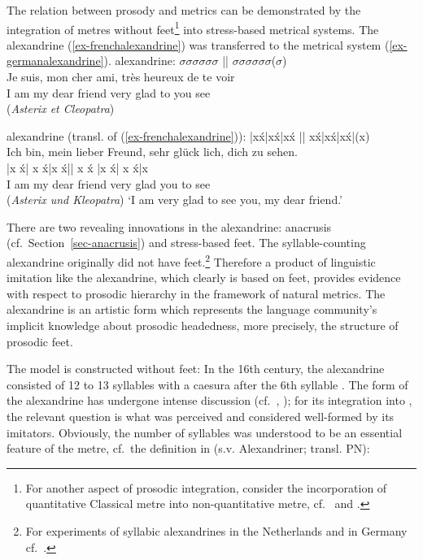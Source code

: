 \documentclass[output=paper
  ,nobabel
  ,uniformtopskip %
]{langscibook}
\begin{document}
The relation between prosody and metrics can be demonstrated by the integration of metres without feet\footnote{For another aspect of prosodic integration, consider the incorporation of quantitative Classical metre into non-quantitative  metre, cf.\ \eg \citet{Wackernagel1831} and \citet{NoelAzizHanna2008b}.} into stress-based metrical systems. The  alexandrine (\ref{ex-frenchalexandrine}) was transferred to the  metrical system (\ref{ex-germanalexandrine}).
\eal
\ex\label{ex-frenchalexandrine}
  alexandrine:  ${\sigma}{\sigma}{\sigma}{\sigma}{\sigma}{\sigma}$ ||  ${\sigma}{\sigma}{\sigma}{\sigma}{\sigma}{\sigma}$(${\sigma}$)\\
\gll Je  suis,  mon  cher  ami,    très  heureux    de  te  voir\\
     I  am  my  dear  friend    very  glad    to  you  see\\
\glt (\textit{Asterix et Cleopatra})

\ex\label{ex-germanalexandrine}
  alexandrine (transl. of (\ref{ex-frenchalexandrine})): |x\'{x}|x\'{x}|x\'{x} || x\'{x}|x\'{x}|x\'{x}|(x)\\
\glll Ich  bin,  mein  lieber  Freund,    sehr  glück  lich,  dich  zu  sehen.\\
      |x  \'{x}|  x  \'{x}|x  \'{x}\hspace{25pt}||  x  \'{x} |x  \'{x}|  x  \'{x}|x\\
      I  am  my  dear  friend    very  glad  {}  you  to  see\\
\glt (\textit{Asterix und Kleopatra})
\glt `I am very glad to see you, my dear friend.'
\zl 

\noindent
There are two revealing innovations in the  alexandrine: anacrusis (cf.~Section~\ref{sec-anacrusis}) and stress-based feet. The  syllable-counting alexandrine originally did not have feet.\footnote{For experiments of syllabic alexandrines in the Netherlands and in Germany cf.\ \citet*[192-197]{Gasparov1996}.} Therefore a product of linguistic imitation like the  alexandrine, which clearly is based on feet, provides evidence with respect to prosodic hierarchy in the framework of natural metrics. The  alexandrine is an artistic form which represents the  language community's implicit knowledge about prosodic headedness, more precisely, the structure of prosodic feet. 

\largerpage
The  model is constructed without feet: In the 16th century, the  alexandrine consisted of 12 to 13 syllables with a caesura after the 6th syllable \citep[107]{Coenen1998}. The form of the  alexandrine has undergone intense discussion (cf.\ \eg \citealt{Bunia2014}, \citealt{Dufter2010}); for its integration into , the relevant question is what was perceived and considered well-formed by its  imitators. Obviously, the number of syllables was understood to be an essential feature of the metre, cf.\ the definition in \citealt{Wagenknecht2007} (s.v. Alexandriner; transl. PN):
\end{document}
